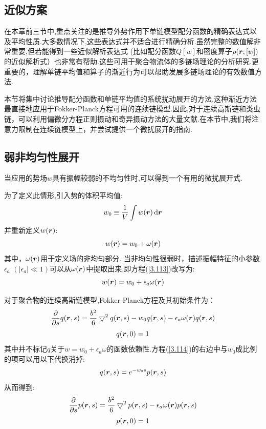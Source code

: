 \subsection{近似方案}
在本章前三节中,重点关注的是推导外势作用下单链模型配分函数的精确表达式以及平均性质.大多数情况下,这些表达式并不适合进行精确分析.虽然完整的数值解非常重要,但若能得到一些近似解析表达式
(比如配分函数$Q[w]$和密度算子$\rho(\bm{r} ;[w])$的近似解析式）也非常有帮助.这些可用于聚合物流体的多链场理论的分析研究.更重要的，理解单链平均值和算子的渐近行为可以帮助发展多链场理论的有效数值方法.

本节将集中讨论推导配分函数和单链平均值的系统扰动展开的方法.这种渐近方法最直接地应用于Fokker-Planck方程可用的连续链模型.因此,对于连续高斯链和类虫链，可以利用偏微分方程正则摄动和奇异摄动方法的大量文献.在本节中,我们将注意力限制在连续链模型上，并尝试提供一个微扰展开的指南.
\subsection{弱非均匀性展开}
当应用的势场$w$具有振幅较弱的不均匀性时,可以得到一个有用的微扰展开式.

为了定义此情形,引入势的体积平均值:
\begin{equation}
w_0\equiv \frac{1}{V} \int w(\bm{r} )\,\mathrm{d}\bm{r} 
\end{equation}
并重新定义$w(\bm{r} )$:
\begin{equation}
w(\bm{r} )=w_0+\omega(\bm{r} ) \label{3.113}
\end{equation}
其中，$\omega(\bm{r} )$用于定义场的非均匀部分.
当非均匀性很弱时，描述振幅特征的小参数$\epsilon_a$ $(|\epsilon_a| \ll 1)$可以从$\omega(\bm{r} )$中提取出来,即方程(\ref{3.113})改写为:
$$w(\bm{r} )=w_0+\epsilon_a \omega(\bm{r} )$$

对于聚合物的连续高斯链模型,Fokker-Planck方程及其初始条件为：
\begin{equation}
\frac{\partial}{\partial s} q(\bm{r} ,s) = \frac{b^2}{6} \bigtriangledown^2 q(\bm{r} ,s) -w_0 q(\bm{r} ,s) -\epsilon_a \omega(\bm{r} ) q(\bm{r} ,s) \label{3.114}
\end{equation}
\begin{equation}
q(\bm{r} ,0) = 1 \label{3.115}
\end{equation}
其中并不标记$q$关于$w = w_0+\epsilon_a \omega$的函数依赖性.方程(\ref{3.114})的右边中与$w_0$成比例的项可以用以下代换消掉:
\begin{equation}
q(\bm{r} ,s) = e^{-w_0 s} p(\bm{r} ,s) \label{3.116}
\end{equation}
从而得到:
\begin{equation}
\frac{\partial}{\partial s} p(\bm{r} ,s) = \frac{b^2}{6} \bigtriangledown^2 p(\bm{r} ,s) -\epsilon_a \omega(\bm{r} ) p(\bm{r} ,s) \label{3.117}
\end{equation}
\begin{equation}
p(\bm{r} ,0) = 1 \label{3.118}
\end{equation}

